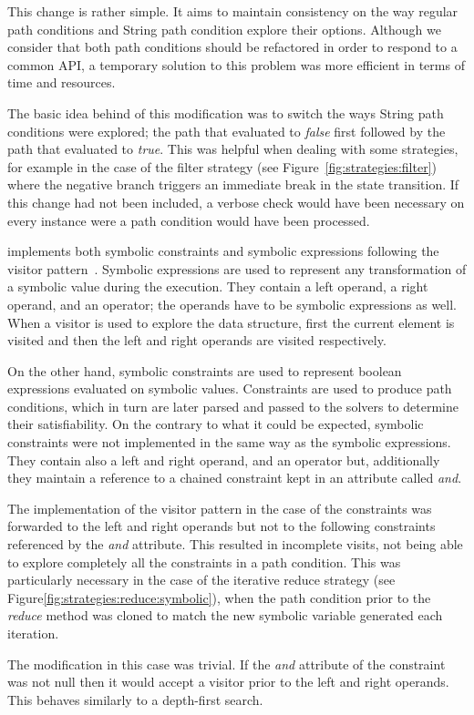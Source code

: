
This change is rather simple. It aims to maintain consistency on the way regular path conditions and String path condition explore their options. Although we consider that both path conditions should be refactored in order to respond to a common API, a temporary solution to this problem was more efficient in terms of time and resources.

The basic idea behind of this modification was to switch the ways String path conditions were explored; the path that evaluated to \textit{false} first followed by the path that evaluated to \textit{true}. This was helpful when dealing with some strategies, for example in the case of the filter strategy (see Figure~\ref{fig:strategies:filter}) where the negative branch triggers an immediate break in the state transition. If this change had not been included, a verbose check would have been necessary on every instance were a path condition would have been processed.


\spf{} implements both symbolic constraints and symbolic expressions following the visitor pattern~\cite{Gamma1994}. Symbolic expressions are used to represent any transformation of a symbolic value during the execution. They contain a left operand, a right operand, and an operator; the operands have to be symbolic expressions as well. When a visitor is used to explore the data structure, first the current element is visited and then the left and right operands are visited respectively. 

On the other hand, symbolic constraints are used to represent boolean expressions evaluated on symbolic values. Constraints are used to produce path conditions, which in turn are later parsed and passed to the solvers to determine their satisfiability. On the contrary to what it could be expected, symbolic constraints were not implemented in the same way as the symbolic expressions. They contain also a left and right operand, and an operator but, additionally they maintain a reference to a chained constraint kept in an attribute called \textit{and}.

The implementation of the visitor pattern in the case of the constraints was forwarded to the left and right operands but not to the following constraints referenced by the \textit{and} attribute. This resulted in incomplete visits, not being able to explore completely all the constraints in a path condition. This was particularly necessary in the case of the iterative reduce strategy (see Figure\ref{fig:strategies:reduce:symbolic}), when the path condition prior to the \textit{reduce} method was cloned to match the new symbolic variable generated each iteration.

The modification in this case was trivial. If the \textit{and} attribute of the constraint was not null then it would accept a visitor prior to the left and right operands. This behaves similarly to a depth-first search.